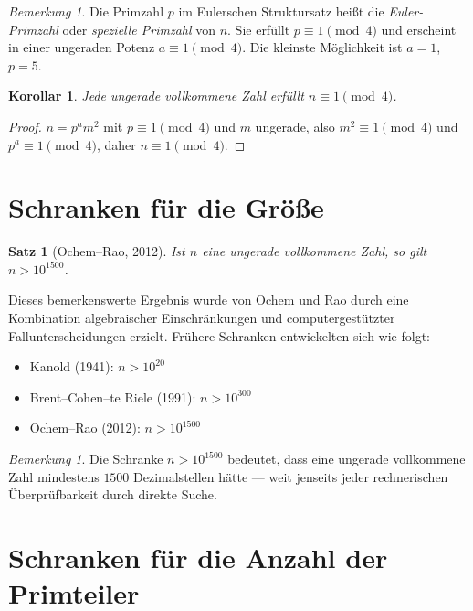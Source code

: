 \documentclass[12pt,a4paper]{amsart}
\newtheorem{satz}[theorem]{Satz}
\newtheorem{korollar}[theorem]{Korollar}
\theoremstyle{definition}
\theoremstyle{remark}
\newtheorem{bemerkung}[theorem]{Bemerkung}
\begin{document}
\begin{bemerkung}
Die Primzahl $p$ im Eulerschen Struktursatz heißt die \emph{Euler-Primzahl}
oder \emph{spezielle Primzahl} von $n$.
Sie erfüllt $p \equiv 1 \pmod{4}$ und erscheint in einer ungeraden Potenz
$a \equiv 1 \pmod{4}$.
Die kleinste Möglichkeit ist $a = 1$, $p = 5$.
\end{bemerkung}

\begin{korollar}
\label{kor:form}
Jede ungerade vollkommene Zahl erfüllt $n \equiv 1 \pmod{4}$.
\end{korollar}

\begin{proof}
$n = p^a m^2$ mit $p \equiv 1 \pmod{4}$ und $m$ ungerade,
also $m^2 \equiv 1 \pmod{4}$ und $p^a \equiv 1 \pmod{4}$,
daher $n \equiv 1 \pmod{4}$.
\end{proof}

\section{Schranken für die Größe}

\begin{satz}[Ochem--Rao, 2012]
\label{satz:ochem}
Ist $n$ eine ungerade vollkommene Zahl, so gilt $n > 10^{1500}$.
\end{satz}

Dieses bemerkenswerte Ergebnis wurde von Ochem und Rao durch eine Kombination
algebraischer Einschränkungen und computergestützter Fallunterscheidungen erzielt.
Frühere Schranken entwickelten sich wie folgt:
\begin{itemize}[nosep]
  \item Kanold (1941): $n > 10^{20}$
  \item Brent--Cohen--te Riele (1991): $n > 10^{300}$
  \item Ochem--Rao (2012): $n > 10^{1500}$
\end{itemize}

\begin{bemerkung}
Die Schranke $n > 10^{1500}$ bedeutet, dass eine ungerade vollkommene Zahl
mindestens $1500$ Dezimalstellen hätte --- weit jenseits jeder rechnerischen
Überprüfbarkeit durch direkte Suche.
\end{bemerkung}

\section{Schranken für die Anzahl der Primteiler}
\end{document}
